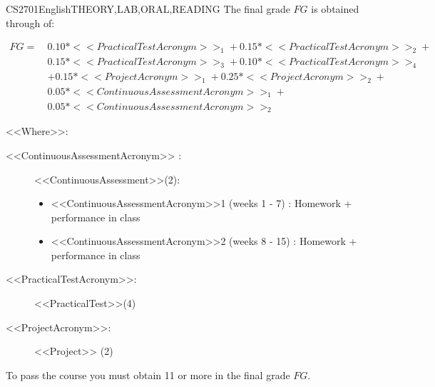     
    \begin{evaluation}{CS2701}{English}{THEORY,LAB,ORAL,READING}
    The final grade $FG$ is obtained through of:
    
    \begin{equation}
       \begin{split}
           FG =~  & 0.10*<<PracticalTestAcronym>>_{1} + 0.15*<<PracticalTestAcronym>>_{2} + \\
                      & 0.15*<<PracticalTestAcronym>>_{3} + 0.10*<<PracticalTestAcronym>>_{4}\\ 
                      & + 0.15*<<ProjectAcronym>>_{1} + 0.25*<<ProjectAcronym>>_{2} +\\
                      & 0.05*<<ContinuousAssessmentAcronym>>_{1} +\\
                      & 0.05*<<ContinuousAssessmentAcronym>>_{2} 
       \end{split}
    \end{equation}
    
    \noindent <<Where>>:
    \begin{description}
        \item[<<ContinuousAssessmentAcronym>> :] <<ContinuousAssessment>>(2):
       \begin{itemize}
               \item  <<ContinuousAssessmentAcronym>>1 (weeks 1 - 7) : Homework + performance in class
                \item <<ContinuousAssessmentAcronym>>2 (weeks 8 - 15) :  Homework + performance in class
         \end{itemize}
        \item[<<PracticalTestAcronym>>:] <<PracticalTest>>(4)
        \item[<<ProjectAcronym>>:] <<Project>> (2)    
    \end{description}
    \noindent To pass the course you must obtain 11 or more in the final grade $FG$.
    \end{evaluation}
    
    
    
